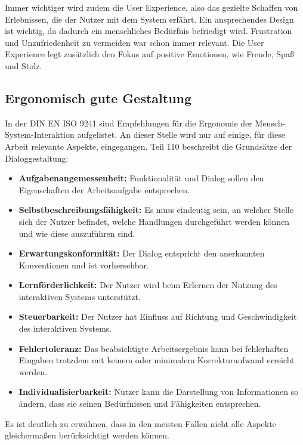 Immer wichtiger wird zudem die User Experience, also das gezielte Schaffen von Erlebnissen, die der Nutzer mit dem System erfährt. Ein ansprechendes Design ist wichtig, da dadurch ein menschliches Bedürfnis befriedigt wird. Frustration und Unzufriedenheit zu vermeiden war schon immer relevant.   Die User Experience legt zusätzlich den Fokus auf positive Emotionen, wie Freude, Spaß und Stolz. \cite{Hassenzahl2006}

\subsection{Ergonomisch gute Gestaltung}
\label{2:ergonomische-Gestaltung}
In der DIN EN ISO 9241 sind Empfehlungen für die Ergonomie der Mensch-System-Interaktion aufgelistet. An dieser Stelle wird nur auf einige, für diese Arbeit relevante Aspekte, eingegangen. Teil 110 \cite{ISO9241-110} beschreibt die Grundsätze der Dialoggestaltung:
\begin{itemize}
\item \textbf{Aufgabenangemessenheit:} Funktionalität und Dialog sollen den Eigenschaften der Arbeitsaufgabe entsprechen.
\item \textbf{Selbstbeschreibungsfähigkeit:}  Es muss eindeutig sein, an welcher Stelle sich der Nutzer befindet, welche Handlungen durchgeführt werden können und wie diese auszuführen sind.
\item \textbf{Erwartungskonformität:} Der Dialog entspricht den anerkannten Konventionen und ist vorhersehbar.
\item \textbf{Lernförderlichkeit:} Der Nutzer wird beim Erlernen der Nutzung des interaktiven Systems unterstützt.
\item \textbf{Steuerbarkeit:} Der Nutzer hat Einfluss auf Richtung und Geschwindigkeit des interaktiven Systems.
\item \textbf{Fehlertoleranz:} Das beabsichtigte Arbeitsergebnis kann bei fehlerhaften Eingaben trotzdem mit keinem oder minimalem Korrekturaufwand erreicht werden.
\item \textbf{Individualisierbarkeit:} Nutzer kann die Darstellung von Informationen so ändern, dass sie seinen Bedürfnissen und Fähigkeiten entsprechen.
\end{itemize}
Es ist deutlich zu erwähnen, dass in den meisten Fällen nicht alle Aspekte gleichermaßen berücksichtigt werden können.

